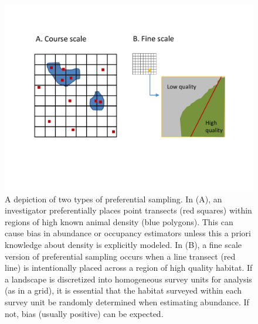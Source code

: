 \documentclass[times,mee,doublespace,]{besauth2}
\begin{document}
\pagebreak

\begin{figure} %
\begin{center}
\includegraphics[width=170mm]{Pref_sampling_diag.pdf}
\caption{A depiction of two types of preferential sampling.  In (A), an investigator preferentially places point transects (red squares) within regions of high known animal density (blue polygons).  This can cause bias in abundance or occupancy estimators unless this a priori knowledge about density is explicitly modeled.  In (B), a fine scale version of preferential sampling occurs when a line transect (red line) is intentionally placed across a region of high quality habitat.  If a landscape is discretized into homogeneous survey units for analysis (as in a grid), it is essential that the habitat surveyed within each survey unit be randomly determined when estimating abundance.  If not, bias (usually positive) can be expected.}
\label{fig:pref}
\end{center}
\end{figure}
\end{document}
